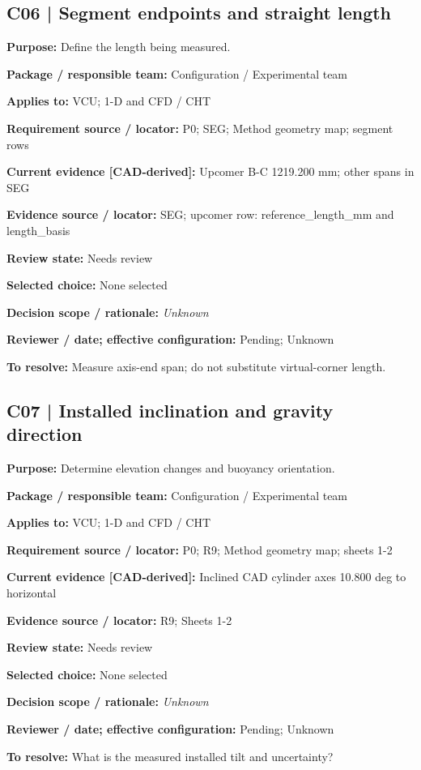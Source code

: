 \documentclass[11pt]{article}
\begin{document}
\begin{minipage}{\textwidth}\small\setlength{\parskip}{2pt}
\subsection*{C06 | Segment endpoints and straight length}
\textbf{Purpose:} Define the length being measured.\par
\textbf{Package / responsible team:} Configuration / Experimental team\par
\textbf{Applies to:} VCU; 1-D and CFD / CHT\par
\textbf{Requirement source / locator:} P0; SEG; Method geometry map; segment rows\par
\textbf{Current evidence [CAD-derived]:} Upcomer B-C 1219.200 mm; other spans in SEG\par
\textbf{Evidence source / locator:} SEG; upcomer row: reference\_\allowbreak{}length\_\allowbreak{}mm and length\_\allowbreak{}basis\par
\textbf{Review state:} Needs review\par
\textbf{Selected choice:} None selected\par
\textbf{Decision scope / rationale:} \textit{Unknown}\par
\textbf{Reviewer / date; effective configuration:} Pending; Unknown\par
\textbf{To resolve:} Measure axis-end span; do not substitute virtual-corner length.\par
\end{minipage}\par\vspace{5pt}
\begin{minipage}{\textwidth}\small\setlength{\parskip}{2pt}
\subsection*{C07 | Installed inclination and gravity direction}
\textbf{Purpose:} Determine elevation changes and buoyancy orientation.\par
\textbf{Package / responsible team:} Configuration / Experimental team\par
\textbf{Applies to:} VCU; 1-D and CFD / CHT\par
\textbf{Requirement source / locator:} P0; R9; Method geometry map; sheets 1-2\par
\textbf{Current evidence [CAD-derived]:} Inclined CAD cylinder axes 10.800 deg to horizontal\par
\textbf{Evidence source / locator:} R9; Sheets 1-2\par
\textbf{Review state:} Needs review\par
\textbf{Selected choice:} None selected\par
\textbf{Decision scope / rationale:} \textit{Unknown}\par
\textbf{Reviewer / date; effective configuration:} Pending; Unknown\par
\textbf{To resolve:} What is the measured installed tilt and uncertainty?\par
\end{minipage}\par\vspace{5pt}
\end{document}
